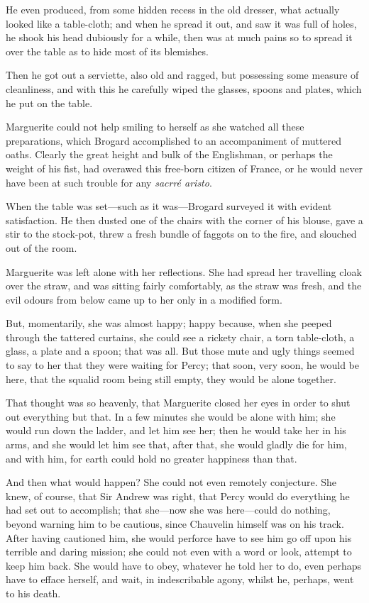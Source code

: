 \documentclass[paper=a5,BCOR=7mm,twoside,DIV=calc,12pt,usegeometry,chapterprefix,endperiod,headings=big]{scrbook}
\begin{document}
He even produced, from some hidden recess in the old dresser, what actually looked like a table-cloth; and when he spread it out, and saw it was full of holes, he shook his head dubiously for a while, then was at much pains so to spread it over the table as to hide most of its blemishes.

Then he got out a serviette, also old and ragged, but possessing some measure of cleanliness, and with this he carefully wiped the glasses, spoons and plates, which he put on the table.

Marguerite could not help smiling to herself as she watched all these preparations, which Brogard accomplished to an accompaniment of muttered oaths. Clearly the great height and bulk of the Englishman, or perhaps the weight of his fist, had overawed this free-born citizen of France, or he would never have been at such trouble for any \textit{sacrré aristo}.

When the table was set---such as it was---Brogard surveyed it with evident satisfaction. He then dusted one of the chairs with the corner of his blouse, gave a stir to the stock-pot, threw a fresh bundle of faggots on to the fire, and slouched out of the room.

Marguerite was left alone with her reflections. She had spread her travelling cloak over the straw, and was sitting fairly comfortably, as the straw was fresh, and the evil odours from below came up to her only in a modified form.

But, momentarily, she was almost happy; happy because, when she peeped through the tattered curtains, she could see a rickety chair, a torn table-cloth, a glass, a plate and a spoon; that was all. But those mute and ugly things seemed to say to her that they were waiting for Percy; that soon, very soon, he would be here, that the squalid room being still empty, they would be alone together.

That thought was so heavenly, that Marguerite closed her eyes in order to shut out everything but that. In a few minutes she would be alone with him; she would run down the ladder, and let him see her; then he would take her in his arms, and she would let him see that, after that, she would gladly die for him, and with him, for earth could hold no greater happiness than that.

And then what would happen? She could not even remotely conjecture. She knew, of course, that Sir Andrew was right, that Percy would do everything he had set out to accomplish; that she---now she was here---could do nothing, beyond warning him to be cautious, since Chauvelin himself was on his track. After having cautioned him, she would perforce have to see him go off upon his terrible and daring mission; she could not even with a word or look, attempt to keep him back. She would have to obey, whatever he told her to do, even perhaps have to efface herself, and wait, in indescribable agony, whilst he, perhaps, went to his death.
\end{document}
